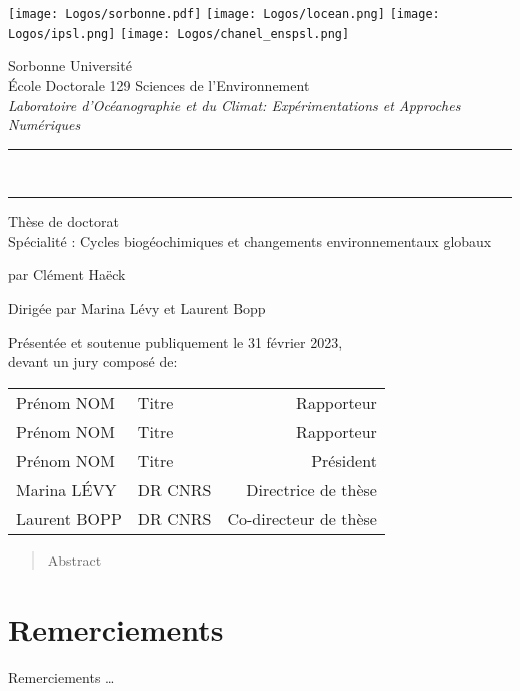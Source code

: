 

\begin{titlingpage}

\begin{center}
  \texttt{[image: Logos/sorbonne.pdf]}
  \hfill
  \texttt{[image: Logos/locean.png]}
  \hfill
  \texttt{[image: Logos/ipsl.png]}
  \hfill
  \texttt{[image: Logos/chanel\_enspsl.png]}

  \vspace{1cm}

  {\LARGE Sorbonne Université}\\[2ex]
  École Doctorale 129 Sciences de l'Environnement\\
  \emph{Laboratoire d'Océanographie et du Climat: Expérimentations et Approches Numériques}

  \vspace{3cm}

  \par\noindent\rule[0.7em]{\textwidth}{2pt}
  {\bfseries\Large \Title}\\
  \par\noindent\rule{\textwidth}{2pt}

  \vspace{3cm}

  Thèse de doctorat\\
  Spécialité : Cycles biogéochimiques et changements environnementaux globaux

  \vspace{1cm}

  {\normalsize par Clément Haëck}

  \vspace{1cm}

  Dirigée par Marina Lévy et Laurent Bopp

  \vspace{2cm}
\end{center}

\par\noindent Présentée et soutenue publiquement le 31 février 2023,\\
devant un jury composé de:

\begin{center}
\begin{tabular}{llr<{\raggedleft}}
  Prénom NOM & Titre & Rapporteur \\
  Prénom NOM & Titre & Rapporteur \\
  Prénom NOM & Titre & Président \\
  Marina LÉVY & DR CNRS & Directrice de thèse \\
  Laurent BOPP & DR CNRS & Co-directeur de thèse \\
\end{tabular}
\end{center}

\end{titlingpage}
\restoregeometry

\frontmatter

\begin{abstract}
Abstract
\end{abstract}

\clearpage
\section*{Remerciements}
Remerciements \dots
